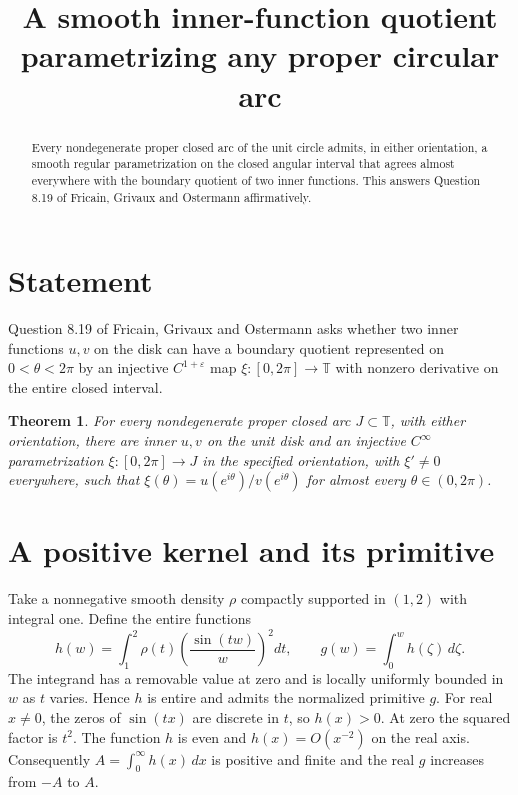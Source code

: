 \documentclass[11pt]{amsart}
\title[Smooth inner quotients for circular arcs]{A smooth inner-function quotient parametrizing any proper circular arc}
\date{}
\newtheorem{theorem}{Theorem}
\begin{document}
\begin{abstract}
Every nondegenerate proper closed arc of the unit circle admits, in either orientation, a smooth regular parametrization on the closed angular interval that agrees almost everywhere with the boundary quotient of two inner functions. This answers Question 8.19 of Fricain, Grivaux and Ostermann affirmatively.
\end{abstract}
\maketitle

\section{Statement}
Question 8.19 of Fricain, Grivaux and Ostermann \cite{fgo} asks whether two inner functions \(u,v\) on the disk can have a boundary quotient represented on \(0<\theta<2\pi\) by an injective \(C^{1+\varepsilon}\) map \(\xi:[0,2\pi]\to\mathbb T\) with nonzero derivative on the entire closed interval.

\begin{theorem}
For every nondegenerate proper closed arc \(J\subset\mathbb T\), with either orientation, there are inner \(u,v\) on the unit disk and an injective \(C^\infty\) parametrization \(\xi:[0,2\pi]\to J\) in the specified orientation, with \(\xi'\ne0\) everywhere, such that \(\xi(\theta)=u(e^{i\theta})/v(e^{i\theta})\) for almost every \(\theta\in(0,2\pi)\).
\end{theorem}

\section{A positive kernel and its primitive}
Take a nonnegative smooth density \(\rho\) compactly supported in \((1,2)\) with integral one. Define the entire functions
\[
 h(w)=\int_1^2\rho(t)\left(\frac{\sin(tw)}{w}\right)^2dt,\qquad
 g(w)=\int_0^w h(\zeta)\,d\zeta .
\]
The integrand has a removable value at zero and is locally uniformly bounded in \(w\) as \(t\) varies. Hence \(h\) is entire and admits the normalized primitive \(g\). For real \(x\ne0\), the zeros of \(\sin(tx)\) are discrete in \(t\), so \(h(x)>0\). At zero the squared factor is \(t^2\). The function \(h\) is even and \(h(x)=O(x^{-2})\) on the real axis. Consequently \(A=\int_0^\infty h(x)\,dx\) is positive and finite and the real \(g\) increases from \(-A\) to \(A\).
\end{document}
